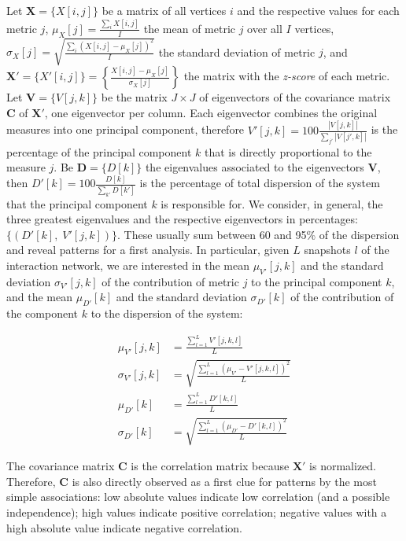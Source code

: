 \documentclass[%
	aip,
	jmp,%
	amsmath,amssymb,
	reprint,%
]{revtex4-1}
\begin{document}
Let $\mathbf{X}=\{X[i,j]\}$ be a matrix of all vertices $i$ and the respective
values for each metric $j$, 
$\mu_X [j]=\frac{\sum_i X[i,j]}{I}$ the mean of metric $j$ over all $I$ vertices, 
$\sigma_X [j]=\sqrt{\frac{\sum_i (X[i,j]-\mu_X [j])^2}{I}}$ the standard deviation of metric $j$,
and $\mathbf{X'}=\{X'[i,j]\}=\left\{\frac{X[i,j]-\mu_X[j]}{\sigma_X[j]}\right\}$ 
the matrix with the \emph{z-score} of each metric. 
Let $\mathbf{V}=\{V[j,k]\}$ be the matrix $J\times J$ of eigenvectors
of the covariance matrix $\mathbf{C}$
of $\mathbf{X'}$, one eigenvector per column.
Each eigenvector combines the original measures into one principal component, therefore
$V'[j,k]=100\frac{|V[j,k]|}{\sum_{j'} |V[j',k]|}$
is the percentage of the principal component $k$
that is directly proportional to the measure $j$.
Be $\mathbf{D}=\{D[k]\}$ the eigenvalues associated to the eigenvectors $\mathbf{V}$,
then $D'[k]=100\frac{D[k]}{\sum_{k'}D[k']}$
is the percentage of total dispersion of the system that the principal component $k$
is responsible for.
We consider, in general, the three greatest eigenvalues and
the respective eigenvectors in percentages:
$\{(D'[k],\;V'[j,k])\}$.
These usually sum between 60 and 95\% of the dispersion
and reveal patterns for a first analysis.
In particular, 
given $L$ snapshots $l$ of the interaction network,
we are interested in the mean
$\mu_{V'}[j,k]$
and the standard deviation $\sigma_{V'}[j,k]$ 
of the contribution of metric $j$ to the principal component $k$,
and the mean
$\mu_{D'}[k]$
and the standard deviation 
$\sigma_{D'}[k]$
of the contribution of the component $k$ to the dispersion
of the system:

\begin{align}\label{eq:pca}
\mu_{V'}[j,k]   &=\frac{\sum_{l=1}^L V'[j,k,l]}{L}\nonumber\\
\sigma_{V'}[j,k]&=\sqrt{\frac{\sum_{l=1}^L (\mu_{V'}-V'[j,k,l])^2}{L}}\\\nonumber
\mu_{D'}[k]&=\frac{\sum_{l=1}^L D'[k,l]}{L}\\\nonumber
\sigma_{D'}[k]&=\sqrt{\frac{\sum_{l=1}^L (\mu_{D'}-D'[k,l])^2}{L}}
\end{align}

The covariance matrix 
$\mathbf{C}$ is the correlation matrix because $\mathbf{X'}$ is normalized.
Therefore, $\mathbf{C}$ is also directly observed as a first clue for patterns
by the most simple associations:
low absolute values indicate low correlation (and a possible independence);
high values indicate positive correlation;
negative values with a high absolute value indicate negative correlation.
\end{document}

